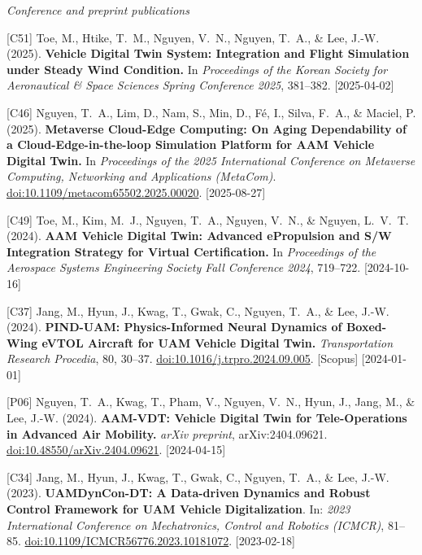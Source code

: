 {\begin{pubenumerate}
\end{pubenumerate}

\textit{Conference and preprint publications}
\begin{pubenumerate}
\item {\color{green}[C51]} Toe, M., Htike, T.\ M., Nguyen, V.\ N., Nguyen, T.\ A., \& Lee, J.-W. (2025). 
  \textbf{Vehicle Digital Twin System: Integration and Flight Simulation under Steady Wind Condition.} 
  In \textit{Proceedings of the Korean Society for Aeronautical \& Space Sciences Spring Conference 2025}, 381--382. [2025-04-02]

\item {\color{green}[C46]} Nguyen, T.\ A., Lim, D., Nam, S., Min, D., F\'e, I., Silva, F.\ A., \& Maciel, P. (2025). 
  \textbf{Metaverse Cloud-Edge Computing: On Aging Dependability of a Cloud-Edge-in-the-loop Simulation Platform for AAM Vehicle Digital Twin.} 
  In \textit{Proceedings of the 2025 International Conference on Metaverse Computing, Networking and Applications (MetaCom)}. 
  \href{https://doi.org/10.1109/metacom65502.2025.00020}{doi:10.1109/metacom65502.2025.00020}. [2025-08-27]

\item {\color{green}[C49]} Toe, M., Kim, M.\ J., Nguyen, T.\ A., Nguyen, V.\ N., \& Nguyen, L.\ V.\ T. (2024). 
  \textbf{AAM Vehicle Digital Twin: Advanced ePropulsion and S/W Integration Strategy for Virtual Certification.} 
  In \textit{Proceedings of the Aerospace Systems Engineering Society Fall Conference 2024}, 719--722. [2024-10-16]

\item {\color{green}[C37]} Jang, M., Hyun, J., Kwag, T., Gwak, C., Nguyen, T.\ A., \& Lee, J.-W. (2024). 
  \textbf{PIND-UAM: Physics-Informed Neural Dynamics of Boxed-Wing eVTOL Aircraft for UAM Vehicle Digital Twin.} 
  \textit{Transportation Research Procedia}, 80, 30--37. 
  \href{https://doi.org/10.1016/j.trpro.2024.09.005}{doi:10.1016/j.trpro.2024.09.005}. [Scopus] [2024-01-01]

\item {\color{blue}[P06]} Nguyen, T.\ A., Kwag, T., Pham, V., Nguyen, V.\ N., Hyun, J., Jang, M., \& Lee, J.-W. (2024). 
  \textbf{AAM-VDT: Vehicle Digital Twin for Tele-Operations in Advanced Air Mobility.} 
  \textit{arXiv preprint}, arXiv:2404.09621. 
  \href{https://doi.org/10.48550/arXiv.2404.09621}{doi:10.48550/arXiv.2404.09621}. [2024-04-15]

\item {\color{green}[C34]} Jang, M., Hyun, J., Kwag, T., Gwak, C., Nguyen, T.\ A., \& Lee, J.-W. (2023). \textbf{UAMDynCon-DT: A Data-driven Dynamics and Robust Control Framework for UAM Vehicle Digitalization}. In: \textit{2023 International Conference on Mechatronics, Control and Robotics (ICMCR)}, 81--85. \href{https://doi.org/10.1109/ICMCR56776.2023.10181072}{doi:10.1109/ICMCR56776.2023.10181072}. [2023-02-18]


\end{pubenumerate}}
